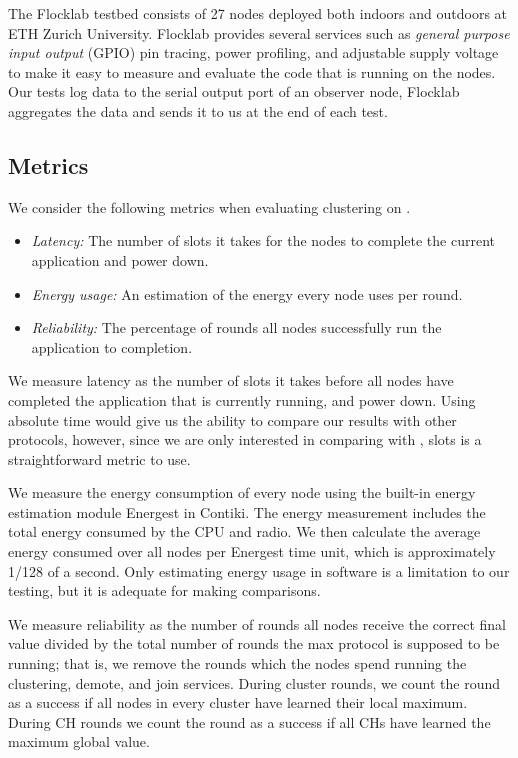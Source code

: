The Flocklab testbed consists of 27 nodes deployed both indoors and outdoors at ETH Zurich University. Flocklab provides several services such as \textit{general purpose input output} (GPIO) pin tracing, power profiling, and adjustable supply voltage \cite{Lim2013-flocklab-introduction} to make it easy to measure and evaluate the code that is running on the nodes. Our tests log data to the serial output port of an observer node, Flocklab aggregates the data and sends it to us at the end of each test.


\subsection{Metrics}
We consider the following metrics when evaluating clustering on \atwo{}.

\begin{itemize}
    \item \textit{Latency:} The number of slots it takes for the nodes to complete the current application and power down.
    \item \textit{Energy usage:} An estimation of the energy every node uses per round.
    \item \textit{Reliability:} The percentage of rounds all nodes successfully run the application to completion.
\end{itemize}

We measure latency as the number of slots it takes before all nodes have completed the application that is currently running, and power down. Using absolute time would give us the ability to compare our results with other protocols, however, since we are only interested in comparing with \atwo{}, slots is a straightforward metric to use.

We measure the energy consumption of every node using the built-in energy estimation module Energest in Contiki. The energy measurement includes the total energy consumed by the CPU and radio. We then calculate the average energy consumed over all nodes per Energest time unit, which is approximately 1/128 of a second. Only estimating energy usage in software is a limitation to our testing, but it is adequate for making comparisons.

We measure reliability as the number of rounds all nodes receive the correct final value divided by the total number of rounds the max protocol is supposed to be running; that is, we remove the rounds which the nodes spend running the clustering, demote, and join services. During cluster rounds, we count the round as a success if all nodes in every cluster have learned their local maximum. During CH rounds we count the round as a success if all CHs have learned the maximum global value.

